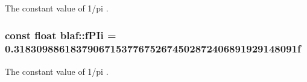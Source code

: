 \-The constant value of 1/pi . 

\hypertarget{namespaceblaf_af3ff8c6e001f8a2feb4a77da9bf2e6c0}{
\subsubsection[{f\-P\-Ii}]{\setlength{\rightskip}{0pt plus 5cm}const float {\bf blaf\-::f\-P\-Ii} = 0.\-31830988618379067153776752674502872406891929148091f}}\label{namespaceblaf_af3ff8c6e001f8a2feb4a77da9bf2e6c0}


\-The constant value of 1/pi . 

